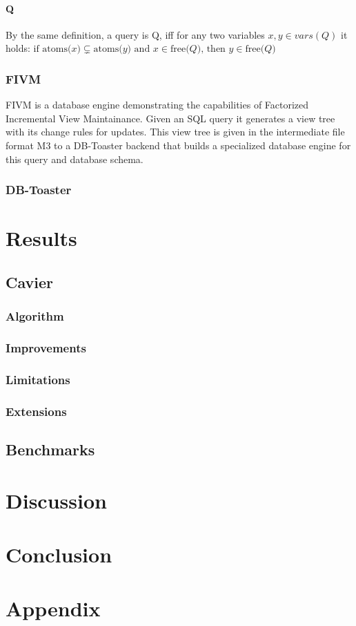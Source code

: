 \documentclass[abstracton,12pt]{scrreprt}
\begin{document}
\subsubsection{Q}
By the same definition, a query is Q, iff for any two variables  $ x, y \in vars(Q)$ it holds:
$\text{if atoms(}x\text{)} \subsetneq \text{atoms(}y\text{) and } x \in \text{free(}Q\text{), then } y \in \text{free(}Q\text{)}$


\subsection{FIVM}
FIVM \cite{FIVM} is a database engine demonstrating the capabilities of Factorized Incremental View Maintainance. Given an SQL query it generates a view tree with its change rules for updates. This view tree is given in the intermediate file format M3 to a DB-Toaster \cite{dbtoaster} backend that builds a specialized database engine for this query and database schema. 
\subsection{DB-Toaster}

\chapter{Results}
\section{Cavier}
\subsection{Algorithm}
\subsection{Improvements}
\subsection{Limitations}
\subsection{Extensions}
\section{Benchmarks}

\chapter{Discussion}

\chapter{Conclusion}

\chapter{Appendix}

\printbibliography
\end{document}

